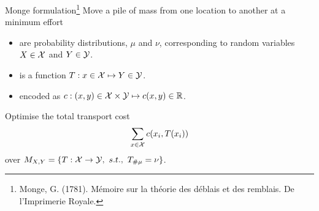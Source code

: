\documentclass[pdf,aspectratio=169,10pt]{beamer}
\begin{document}
\begin{frame}[plain]{Monge formulation\footnote{Monge, G. (1781).
Mémoire sur la théorie des déblais et des remblais.
De l'Imprimerie Royale.}}
 Move a pile of mass from one location to another at a minimum effort\\
\vspace{1em}

\begin{minipage}[t]{0.69\textwidth}
   \begin{itemize}
       \item {} are probability distributions, $\mu$ and $\nu$, corresponding to random variables $X\in{\mathcal{X}}$ and $Y\in{\mathcal{Y}}$. 
       \item {} is a function $T: x \in {\mathcal{X}}\mapsto Y\in{\mathcal{Y}}$.
    \item {} encoded as $c: (x,y)\in{\mathcal{X}}\times{\mathcal{Y}}\mapsto c(x,y)\in{\mathbb{R}}$.
   \end{itemize}
\vspace{1em}

 Optimise the total transport cost
    \begin{equation}
        \sum_{x\in{\mathcal{X}}} c(x_i, T(x_i))
    \end{equation}
    over $M_{X,Y} = \{ T: {\mathcal{X}} \to {\mathcal{Y}},\ s.t.,\ T_{\#\mu}=\nu \}$.
\end{minipage}   
\hfill
\begin{minipage}[t]{0.3\textwidth}
\vspace{2em}
\end{minipage}   

\end{frame}
\end{document}

